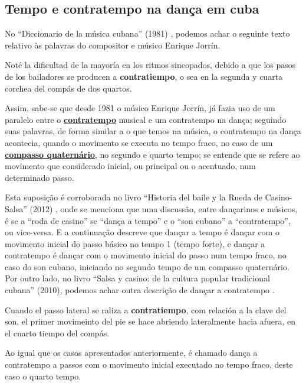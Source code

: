 \subsection{Tempo e contratempo na dança em cuba}
\label{subsec:contratempocuba}
No ``Diccionario de la música cubana'' (1981) 
\cite[pp. 113]{orovio1981diccionario} \cite[pp. 57]{santana2005merengue},
podemos achar o seguinte texto relativo às palavras do compositor e músico Enrique Jorrín.
\begin{citando}
Noté la dificultad de la mayoría en los ritmos sincopados, 
debido a que los pasos de los bailadores se producen a \textbf{contratiempo},
o sea en la segunda y cuarta corchea del compás de dos quartos.
\end{citando}
Assim, sabe-se que desde 1981 o músico Enrique Jorrín, 
já fazia uso de um paralelo entre o \hyperref[sec:contratempo]{\textbf{contratempo}} 
musical e um contratempo na dança;
seguindo suas palavras, de forma similar a o que temos na música, o contratempo na dança acontecia,
quando o movimento se executa no tempo fraco, 
no caso de um \hyperref[subsec:compassoquaternario]{\textbf{compasso quaternário}},
no segundo e quarto tempo;
se entende que se refere ao movimento que considerado inicial, ou principal ou o acentuado,
num determinado passo.

Esta suposição é corroborada no livro ``Historia del baile y la Rueda de Casino-Salsa'' (2012) \cite{borges2012historia},
onde se menciona que uma discussão, entre dançarinos e músicos,
é se a ``roda de casino'' se ``dança a tempo'' e o ``son cubano'' a ``contratempo'',
ou vice-versa. E a continuação descreve que dançar a tempo
é dançar com o movimento inicial do passo básico no tempo 1 (tempo forte),
e dançar a contratempo é dançar com o movimento inicial do passo num tempo fraco, 
no caso do son cubano, iniciando no segundo tempo de um compasso quaternário.
Por outro lado, no livro ``Salsa y casino: de la cultura popular tradicional cubana'' (2010),
podemos achar outra descrição de dançar a contratempo \cite[pp. 63]{gutierrez2010salsa}.
\begin{citando}
Cuando el passo lateral se raliza a \textbf{contratiempo},
com relación a la clave del son,
el primer movimeinto del pie se hace abriendo lateralmente hacia afuera,
en el cuarto tiempo del compás.
\end{citando}
Ao igual que os casos apresentados anteriormente,
é chamado dança a contratempo a passos com o movimento inicial  executado no tempo fraco,
deste caso o quarto tempo.

